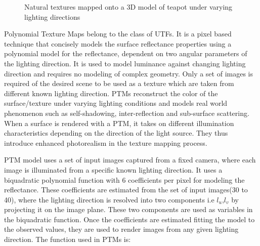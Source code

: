 \begin{figure}[t]
\centering
{}
\caption
{Natural textures mapped onto a 3D model of teapot under varying lighting directions}
\label{fig:model}
\end{figure}
Polynomial Texture Maps \cite{C4}
belong to the class of UTFs. It is a pixel
based technique that concisely models the surface reflectance properties using a
polynomial model for the reflectance, dependent on two angular parameters of the
lighting direction. 
It is used to model luminance
against changing lighting direction and requires
no modeling of complex geometry. Only a set of images is required of the desired scene to be used as a
texture which are taken from different known lighting
direction. PTMs reconstruct the color of the surface/texture under varying
lighting conditions and models real world phenomenon such as
self-shadowing, inter-reflection and sub-surface scattering.
When a surface is rendered with a PTM, it takes on different illumination
characteristics depending on the direction of the light source. They thus introduce
enhanced photorealism in the texture mapping process.

PTM model uses a set of input images captured from a fixed camera, where each
image is illuminated from a specific known lighting direction. It uses a
biquadratic polynomial function with 6 coefficients per pixel for modeling the
reflectance. These coefficients are estimated from the set of input images(30 to
40), where the lighting direction is resolved into two components i.e
$l_{u}$,$l_{v}$ by projecting it on the image plane. These two components are
used as variables in the biquadratic function. Once the coefficients are
estimated fitting the model to the observed values, they are used to render
images from any given lighting direction.
The function used in PTMs is:


